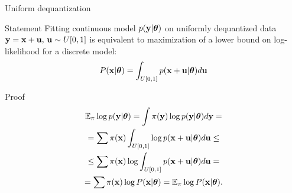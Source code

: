 \begin{frame}{Uniform dequantization}
	\begin{block}{Statement}
		Fitting continuous model $p(\mathbf{y} | \boldsymbol{\theta})$ on uniformly dequantized data $\mathbf{y} = \mathbf{x} + \mathbf{u}, \, \mathbf{u} \sim U[0, 1]$ is equivalent to maximization of a lower bound on log-likelihood for a discrete model:
		\vspace{-0.2cm}
		\[
		P(\mathbf{x} | \boldsymbol{\theta}) = \int_{U[0, 1]} p(\mathbf{x} + \mathbf{u} | \boldsymbol{\theta}) d \mathbf{u}
		\]
		\vspace{-0.5cm} 
	\end{block}
	\begin{block}{Proof}
		\vspace{-0.8cm}
		\begin{multline*}
			\mathbb{E}_{\pi} \log p(\mathbf{y} | \boldsymbol{\theta}) = \int \pi(\mathbf{y}) \log p(\mathbf{y} | \boldsymbol{\theta}) d \mathbf{y} = \\ 
			= \sum \pi(\mathbf{x}) \int_{U[0,1]} \log p(\mathbf{x} + \mathbf{u} | \boldsymbol{\theta}) d \mathbf{u} \leq \\
			 \leq \sum \pi(\mathbf{x}) \log \int_{U[0,1]}  p(\mathbf{x} + \mathbf{u} | \boldsymbol{\theta}) d \mathbf{u} = \\
			 = \sum \pi(\mathbf{x}) \log P(\mathbf{x} | \boldsymbol{\theta}) = \mathbb{E}_{\pi} \log P(\mathbf{x} | \boldsymbol{\theta}).
		\end{multline*}
	\end{block}
\end{frame}
